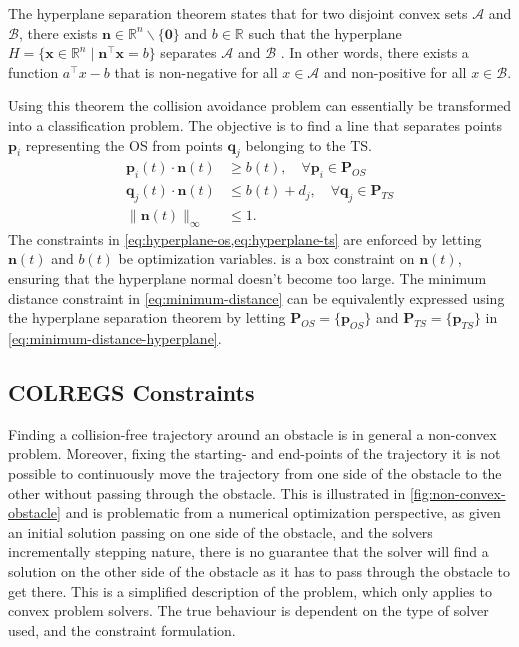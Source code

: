 The hyperplane separation theorem states that for two disjoint convex sets $\mathcal A$ and $\mathcal B$, there exists $\mathbf n\in \mathbb R^n\backslash\{\mathbf0\}$ and $b\in\mathbb R$ such that the hyperplane $H=\{\mathbf x\in\mathbb R^n \mid \mathbf n^\top \mathbf x = b\}$ separates $\mathcal A$ and $\mathcal B$ \citep{Boyd2004-ih}. In other words, there exists a function $a^\top x - b$ that is non-negative for all $x \in \mathcal A$ and non-positive for all $x \in \mathcal B$. 

Using this theorem the collision avoidance problem can essentially be transformed into a classification problem. The objective is to find a line that separates points $\mathbf p_i$ representing the OS from points $\mathbf q_j$ belonging to the TS.
\begin{subequations}\label{eq:minimum-distance-hyperplane}
    \begin{align}
        \mathbf p_{i}(t) \cdot{\mathbf n}(t) &\ge b(t), \quad\forall \mathbf p_i\in\mathbf P_{OS}
        \label{eq:hyperplane-os} \\
        \mathbf q_{j}(t) \cdot{\mathbf n}(t) &\le b(t) + d_{j}, \quad\forall \mathbf q_j\in\mathbf P_{TS}
        \label{eq:hyperplane-ts} \\
        \|{\mathbf n}(t)\|_\infty &\le 1.
        \label{eq:hyperplane-norm}
    \end{align}
\end{subequations}
The constraints in \cref{eq:hyperplane-os,eq:hyperplane-ts} are enforced by
letting $\mathbf n(t)$ and $b(t)$ be optimization variables.  is a box constraint on $\mathbf n(t)$, ensuring that the hyperplane normal doesn't become too large. The minimum distance constraint in \cref{eq:minimum-distance} can be equivalently expressed using the hyperplane separation theorem by letting $\mathbf P_{OS} = \{\mathbf p_{OS}\}$ and $\mathbf P_{TS} = \{\mathbf p_{TS}\}$ in \cref{eq:minimum-distance-hyperplane}.

\subsection{COLREGS Constraints}

Finding a collision-free trajectory around an obstacle is in general a non-convex problem. Moreover, fixing the starting- and end-points of the trajectory it is not possible to continuously move the trajectory from one side of the obstacle to the other without passing through the obstacle. This is illustrated in \cref{fig:non-convex-obstacle} and is problematic from a numerical optimization perspective, as given an initial solution passing on one side of the obstacle, and the solvers incrementally stepping nature, there is no guarantee that the solver will find a solution on the other side of the obstacle as it has to pass through the obstacle to get there. This is a simplified description of the problem, which only applies to convex problem solvers. The true behaviour is dependent on the type of solver used, and the constraint formulation.


